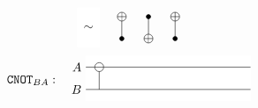 \documentclass[a4paper,12pt,fleqn]{article}
\newcommand\cnot{\mathtt{CNOT}}
\begin{document}
\begin{figure}
\begin{equation}
{\begin{tikzpicture}[scale=1.200000,x=1pt,y=1pt]
\draw[fill=white,color=white] (105.000000, -6.000000) rectangle (120.000000, 21.000000);
\draw (112.500000, 7.500000) node {$\sim$};
\draw (135.000000,15.000000) -- (135.000000,0.000000);
\begin{scope}
\draw[fill=white] (135.000000, 15.000000) circle(3.000000pt);
\clip (135.000000, 15.000000) circle(3.000000pt);
\draw (132.000000, 15.000000) -- (138.000000, 15.000000);
\draw (135.000000, 12.000000) -- (135.000000, 18.000000);
\end{scope}
\filldraw (135.000000, 0.000000) circle(1.500000pt);
\draw (153.000000,15.000000) -- (153.000000,0.000000);
\begin{scope}
\draw[fill=white] (153.000000, 0.000000) circle(3.000000pt);
\clip (153.000000, 0.000000) circle(3.000000pt);
\draw (150.000000, 0.000000) -- (156.000000, 0.000000);
\draw (153.000000, -3.000000) -- (153.000000, 3.000000);
\end{scope}
\filldraw (153.000000, 15.000000) circle(1.500000pt);
\draw (171.000000,15.000000) -- (171.000000,0.000000);
\begin{scope}
\draw[fill=white] (171.000000, 15.000000) circle(3.000000pt);
\clip (171.000000, 15.000000) circle(3.000000pt);
\draw (168.000000, 15.000000) -- (174.000000, 15.000000);
\draw (171.000000, 12.000000) -- (171.000000, 18.000000);
\end{scope}
\filldraw (171.000000, 0.000000) circle(1.500000pt);
\end{tikzpicture}
}
\end{equation}
\begin{equation}\label{HHXHH}
    \cnot_{BA} : \ \raisebox{-5mm}{
\begin{tikzpicture}[scale=1.200000,x=1pt,y=1pt]
\filldraw[color=white] (0.000000, -7.500000) rectangle (111.000000, 22.500000);
\draw[color=black] (0.000000,15.000000) -- (111.000000,15.000000);
\draw[color=black] (0.000000,15.000000) node[left] {$A$};
\draw[color=black] (0.000000,0.000000) -- (111.000000,0.000000);
\draw[color=black] (0.000000,0.000000) node[left] {$B$};
\draw (9.000000,15.000000) -- (9.000000,0.000000);
\begin{scope}
\draw[fill=white] (9.000000, 15.000000) circle(3.000000pt);
\clip (9.000000, 15.000000) circle(3.000000pt);
\draw (6.000000, 15.000000) -- (12.000000, 15.000000);

\end{scope}
\end{tikzpicture}}
\end{equation}
\end{figure}
\end{document}
